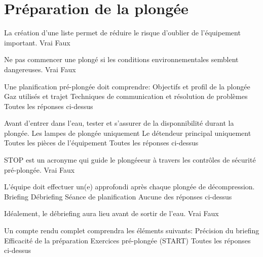 \documentclass[english,12pt,a4paper]{article}
\begin{document}
	\section{Préparation de la plongée}
	\begin{outline}
		\1 La création d'une liste permet de réduire le risque d'oublier de l'équipement important.
			\2 Vrai
			\2 Faux

		\1 Ne pas commencer une plongé si les conditions environnementales semblent dangereuses.
			\2 Vrai
			\2 Faux

		\1 Une planification pré-plongée doit comprendre:
			\2 Objectifs et profil de la plongée
			\2 Gaz utilisés et trajet
			\2 Techniques de communication et résolution de problèmes
			\2 Toutes les réponses ci-dessus

		\1 Avant d'entrer dans l'eau, tester \underline{\hspace{1.5cm}} et s'assurer de la disponnibilité durant la plongée.
			\2 Les lampes de plongée uniquement
			\2 Le détendeur principal uniquement
			\2 Toutes les pièces de l'équipement
			\2 Toutes les réponses ci-dessus

		\1 STOP est un acronyme qui guide le plongéeeur à travers les contrôles de sécurité pré-plongée.
			\2 Vrai
			\2 Faux

		\1 L'équipe doit effectuer un(e) \underline{\hspace{1.5cm}} approfondi après chaque plongée de décompression.
			\2 Briefing
			\2 Débriefing
			\2 Séance de planification
			\2 Aucune des réponses ci-dessus

		\1 Idéalement, le débriefing aura lieu avant de sortir de l'eau.
			\2 Vrai
			\2 Faux

		\1 Un compte rendu complet comprendra les éléments suivants:
			\2 Précision du briefing
			\2 Efficacité de la préparation
			\2 Exercices pré-plongée (START)
			\2 Toutes les réponses ci-dessus
	\end{outline}
	\pagebreak
\end{document}
